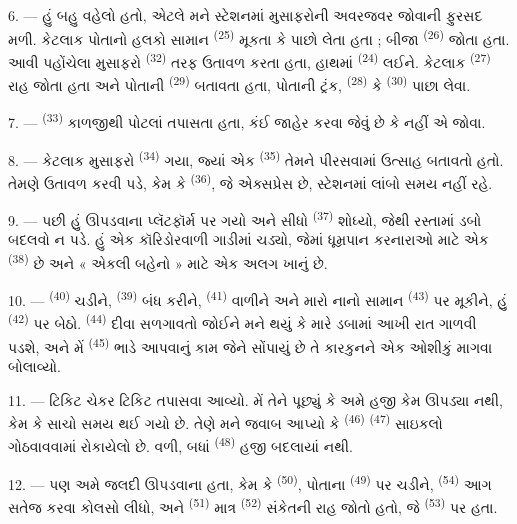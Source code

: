 6. --- હું બહુ વહેલો હતો, એટલે મને સ્ટેશનમાં મુસાફરોની અવરજવર જોવાની
ફુરસદ મળી. કેટલાક પોતાનો હલકો સામાન 
\textsuperscript{(25)} મૂકતા કે પાછો લેતા હતા ; બીજા
 \textsuperscript{(26)} જોતા હતા. આવી પહોંચેલા મુસાફરો
 \textsuperscript{(32)} તરફ ઉતાવળ કરતા હતા,
હાથમાં  \textsuperscript{(24)} લઈને. કેટલાક  \textsuperscript{(27)} રાહ જોતા હતા અને પોતાની
 \textsuperscript{(29)} બતાવતા હતા, પોતાની ટ્રંક,
 \textsuperscript{(28)} કે 
\textsuperscript{(30)} પાછા લેવા.

7. ---  \textsuperscript{(33)} કાળજીથી પોટલાં
તપાસતા હતા, કંઈ જાહેર કરવા જેવું છે કે નહીં એ જોવા.

8. --- કેટલાક મુસાફરો  \textsuperscript{(34)} ગયા,
જ્યાં એક  \textsuperscript{(35)} તેમને પીરસવામાં ઉત્સાહ
બતાવતો હતો. તેમણે ઉતાવળ કરવી પડે, કેમ કે 
\textsuperscript{(36)}, જે એક્સપ્રેસ છે, સ્ટેશનમાં લાંબો સમય નહીં રહે.

9. --- પછી હું ઊપડવાના પ્લૅટફૉર્મ પર ગયો અને સીધો 
\textsuperscript{(37)} શોધ્યો, જેથી રસ્તામાં ડબો બદલવો ન પડે. હું એક
કૉરિડોરવાળી ગાડીમાં ચડ્યો, જેમાં ધૂમ્રપાન કરનારાઓ માટે એક
 \textsuperscript{(38)} છે અને « એકલી બહેનો » માટે એક
અલગ ખાનું છે.

\VUsaut{3.0mm}

10. ---  \textsuperscript{(40)} ચડીને,
 \textsuperscript{(39)} બંધ કરીને, 
\textsuperscript{(41)} વાળીને અને મારો નાનો સામાન  \textsuperscript{(43)} પર મૂકીને, હું 
\textsuperscript{(42)} પર બેઠો. 
\textsuperscript{(44)} દીવા સળગાવતો જોઈને મને થયું કે મારે ડબામાં આખી
રાત ગાળવી પડશે, અને મેં  \textsuperscript{(45)} ભાડે
આપવાનું કામ જેને સોંપાયું છે તે કારકુનને એક ઓશીકું માગવા બોલાવ્યો.

11. --- ટિકિટ ચેકર ટિકિટ તપાસવા આવ્યો. મેં તેને પૂછ્યું કે અમે હજી કેમ
ઊપડ્યા નથી, કેમ કે સાચો સમય થઈ ગયો છે. તેણે મને જવાબ આપ્યો કે
 \textsuperscript{(46)} 
\textsuperscript{(47)} સાઇકલો ગોઠવાવવામાં રોકાયેલો છે. વળી, બધાં
 \textsuperscript{(48)} હજી બદલાયાં નથી.

12. --- પણ અમે જલદી ઊપડવાના હતા, કેમ કે 
\textsuperscript{(50)}, પોતાના  \textsuperscript{(49)} પર
ચડીને,  \textsuperscript{(54)} આગ સતેજ કરવા કોલસો
લીધો, અને  \textsuperscript{(51)} માત્ર  \textsuperscript{(52)} સંકેતની રાહ જોતો હતો, જે
 \textsuperscript{(53)} પર હતા.

